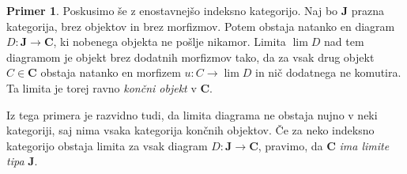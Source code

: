 \documentclass[12pt,a4paper]{book}
\theoremstyle{definition}
\theoremstyle{plain}
\theoremstyle{definition}
\newtheorem{primer}{Primer}[section]
\theoremstyle{remark}
\newcommand{\cat}[1]{\textbf{#1}}
\begin{document}
\begin{primer}
Poskusimo še z enostavnejšo indeksno kategorijo. Naj bo $\cat{J}$ prazna kategorija, brez objektov in brez morfizmov. Potem obstaja natanko en diagram $D : \cat{J} \to \cat{C}$, ki nobenega objekta ne pošlje nikamor. Limita $\lim D$ nad tem diagramom je objekt brez dodatnih morfizmov tako, da za vsak drug objekt $C \in \cat{C}$ obstaja natanko en morfizem $u : C \to \lim D$ in nič dodatnega ne komutira. Ta limita je torej ravno \emph{končni objekt} v $\cat{C}$.
\end{primer}
Iz tega primera je razvidno tudi, da limita diagrama ne obstaja nujno v neki kategoriji, saj nima vsaka kategorija končnih objektov. Če za neko indeksno kategorijo obstaja limita za vsak diagram $D : \cat{J} \to \cat{C}$, pravimo, da $\cat{C}$ \emph{ima limite tipa} $\cat{J}$.
\end{document}
